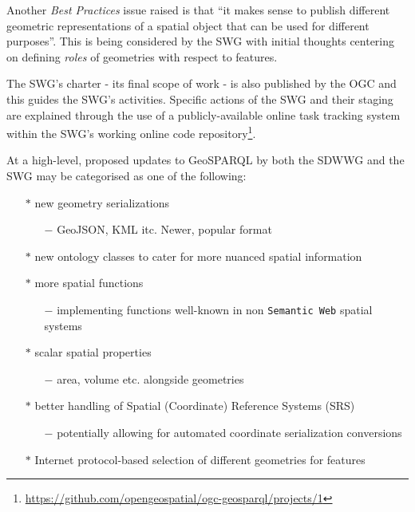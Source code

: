 \documentclass[runningheads]{llncs}
\begin{document}
Another \textit{Best Practices} issue raised is that ``it makes sense to publish different geometric representations 
of a spatial object that can be used for different purposes''. This is being considered by the SWG with initial
thoughts centering on defining \textit{roles} of geometries with respect to features.

The SWG's charter - its final scope of work - is also published by the OGC \cite{abhayaratna2020ogc} and this guides 
the SWG's activities. Specific actions of the SWG and their staging are explained through the use of a publicly-available 
online task tracking system within the SWG's working online code repository\footnote{\url{https://github.com/opengeospatial/ogc-geosparql/projects/1}}.

At a high-level, proposed updates to GeoSPARQL by both the SDWWG and the SWG may be categorised as one of the following:

\begin{itemize}
    \item[$\ast$] new geometry serializations
    \begin{itemize}
        \item[$-$] GeoJSON, KML itc. Newer, popular format
    \end{itemize} 
    \item[$\ast$] new ontology classes to cater for more nuanced spatial information
    \item[$\ast$] more spatial functions
    \begin{itemize}
        \item[$-$] implementing functions well-known in non \texttt{Semantic Web} spatial systems
    \end{itemize} 
    \item[$\ast$] scalar spatial properties 
    \begin{itemize}
        \item[$-$] area, volume etc. alongside geometries
    \end{itemize} 
    \item[$\ast$] better handling of Spatial (Coordinate) Reference Systems (SRS)
    \begin{itemize}
        \item[$-$] potentially allowing for automated coordinate serialization conversions
    \end{itemize} 
    \item[$\ast$] Internet protocol-based selection of different geometries for features
\end{itemize}
\end{document}
